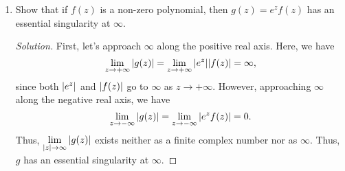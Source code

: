 \documentclass[11pt]{article}
\theoremstyle{definition}
\newenvironment{soln}{\begin{proof}[Solution]}{\end{proof}}
\begin{document}
\begin{enumerate}[leftmargin=*]
\begin{soln}
        Suppose for the sake of contradiction that $v(x,y)$ is a harmonic conjugate of $u(x,y)$ on $D$, so that $f = u + \iota v$ is holomorphic on $D$. By the Cauchy-Riemann equations, we must have
        \[
            \nabla v(x,y) = \left( -\frac{2y}{x^2 + y^2}, \frac{2x}{x^2 + y^2} \right).
        \]
        However, we know from MA111 that the above is not possible! For instance, the line integral of $\nabla v$ along a circle $C$ of radius $R$ (where $1 < R < 2$) must turn out to be zero. We show that this is not the case. Consider a parameterisation $\gamma \colon [0,2\pi] \to D$ defined by
        \[
            \gamma(\theta) = (R\cos\theta, R\sin\theta).
        \]
        We then have
        \begin{align*}
            \oint_{C} \nabla v \cdot \mathrm{d}\gamma &= \int_0^{2\pi}  \left( -\frac{2R\sin\theta}{R^2}, \frac{2R\cos\theta}{R^2} \right) \cdot \left( -R\sin\theta, R\cos\theta \right) \, \mathrm{d}\theta \\
            &= \int_0^{2\pi} (2\sin^2\theta + 2\cos^2\theta) \, \mathrm{d}\theta \\
            &= 4\pi \neq 0. \qedhere
        \end{align*}
    \end{soln}
    
    \item Show that if $f(z)$ is a non-zero polynomial, then $g(z) = e^zf(z)$ has an essential singularity at $\infty$. 
    
    \begin{soln}
        First, let's approach $\infty$ along the positive real axis. Here, we have
        \[
            \lim_{z \to +\infty} \abs{g(z)} = \lim_{z \to +\infty} \abs{e^z} \abs{f(z)} = \infty,
        \]
        since both $\abs{e^z}$ and $\abs{f(z)}$ go to $\infty$ as $z \to +\infty$. However, approaching $\infty$ along the negative real axis, we have
        \[
            \lim_{z \to -\infty} \abs{g(z)} = \lim_{z \to -\infty} \abs{e^z f(z)} = 0.
        \]
        Thus, $\displaystyle\lim_{\abs{z} \to \infty} \abs{g(z)}$ exists neither as a finite complex number nor as $\infty$. Thus, $g$ has an essential singularity at $\infty$.
    \end{soln}
\end{enumerate}
\end{document}
